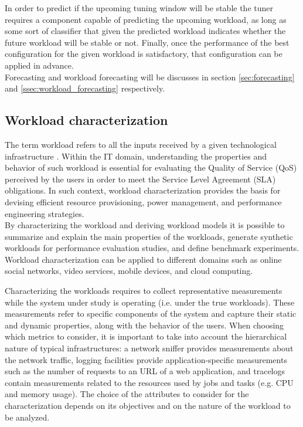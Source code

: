 \documentclass[a4paper, 12pt]{article} %
\begin{document}
	In order to predict if the upcoming tuning window will be stable the tuner requires a component capable of predicting the upcoming workload, as long as some sort of classifier that given the predicted workload indicates whether the future workload will be stable or not.
	Finally, once the performance of the best configuration for the given workload is satisfactory, that configuration can be applied in advance.\\
	Forecasting and workload forecasting will be discusses in section \ref{sec:forecasting} and \ref{ssec:workload_forecasting} respectively.
	
	\subsection{Workload characterization} \label{ssec:workload_characterization}
	The term workload refers to all the inputs received by a given technological infrastructure \cite{WorkloadCharacterization}. Within the IT domain, understanding the properties and behavior of such workload is essential for evaluating the Quality of Service (QoS) perceived by the users in order to meet the Service Level Agreement (SLA) obligations. In such context, workload characterization provides the basis for devising efficient resource provisioning, power management, and performance engineering strategies.\\
	By characterizing the workload and deriving workload models it is possible to summarize and explain the main properties of the workloads, generate synthetic workloads for performance evaluation studies, and define benchmark experiments. Workload characterization can be applied to different domains such as online social networks, video services, mobile devices, and cloud computing.
	
	Characterizing the workloads requires to collect representative measurements while the system under study is operating (i.e. under the true workloads). These measurements refer to specific components of the system and capture their static and dynamic properties, along with the behavior of the users. When choosing which metrics to consider, it is important to take into account the hierarchical nature of typical infrastructures: a network sniffer provides measurements about the network traffic, logging facilities provide application-specific measurements such as the number of requests to an URL of a web application, and tracelogs contain measurements related to the resources used by jobs and tasks (e.g. CPU and memory usage). The choice of the attributes to consider for the characterization depends on its objectives and on the nature of the workload to be analyzed.
	
\end{document}
